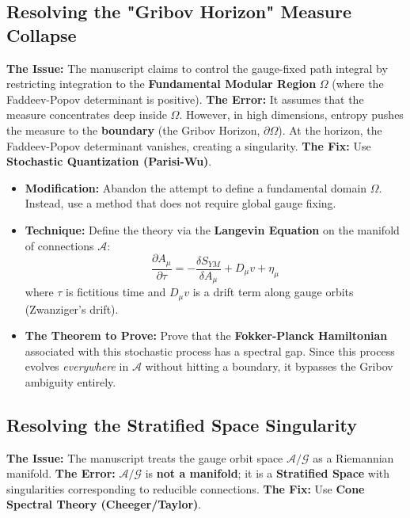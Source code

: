 \subsection{Resolving the "Gribov Horizon" Measure Collapse}
\textbf{The Issue:} The manuscript claims to control the gauge-fixed path integral by restricting integration to the \textbf{Fundamental Modular Region} $\Omega$ (where the Faddeev-Popov determinant is positive).
\textbf{The Error:} It assumes that the measure concentrates deep inside $\Omega$. However, in high dimensions, entropy pushes the measure to the \textbf{boundary} (the Gribov Horizon, $\partial \Omega$). At the horizon, the Faddeev-Popov determinant vanishes, creating a singularity.
\textbf{The Fix:} Use \textbf{Stochastic Quantization (Parisi-Wu)}.

\begin{itemize}
    \item \textbf{Modification:} Abandon the attempt to define a fundamental domain $\Omega$. Instead, use a method that does not require global gauge fixing.
    \item \textbf{Technique:} Define the theory via the \textbf{Langevin Equation} on the manifold of connections $\mathcal{A}$:
    \begin{equation}
    \frac{\partial A_\mu}{\partial \tau} = -\frac{\delta S_{YM}}{\delta A_\mu} + D_\mu v + \eta_\mu
    \end{equation}
    where $\tau$ is fictitious time and $D_\mu v$ is a drift term along gauge orbits (Zwanziger's drift).
    \item \textbf{The Theorem to Prove:} Prove that the \textbf{Fokker-Planck Hamiltonian} associated with this stochastic process has a spectral gap. Since this process evolves \textit{everywhere} in $\mathcal{A}$ without hitting a boundary, it bypasses the Gribov ambiguity entirely.
\end{itemize}

\subsection{Resolving the Stratified Space Singularity}
\textbf{The Issue:} The manuscript treats the gauge orbit space $\mathcal{A}/\mathcal{G}$ as a Riemannian manifold.
\textbf{The Error:} $\mathcal{A}/\mathcal{G}$ is \textbf{not a manifold}; it is a \textbf{Stratified Space} with singularities corresponding to reducible connections.
\textbf{The Fix:} Use \textbf{Cone Spectral Theory (Cheeger/Taylor)}.

